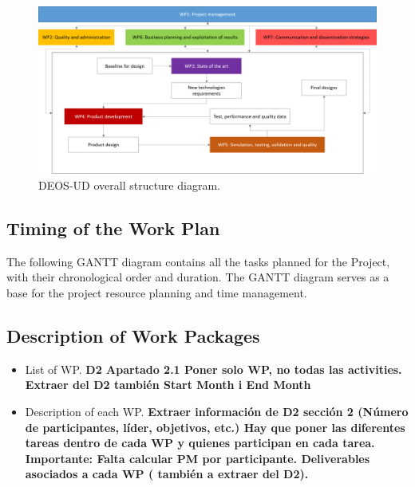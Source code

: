 \begin{figure}[H]
\centering
\includegraphics[width=\textwidth]{images/overallstructure.png}
\caption{DEOS-UD overall structure diagram.} 
\label{overallstructure}
\end{figure}

\subsection{Timing of the Work Plan}

The following GANTT diagram contains all the tasks planned for the Project, with their chronological order and duration. The GANTT diagram serves as a base for the project resource planning and time management.

\subsection{Description of Work Packages}

\begin{itemize}

\item List of WP. \textbf{D2 Apartado 2.1 Poner solo WP, no todas las activities. Extraer del D2 también Start Month i End Month}

\item Description of each WP. \textbf{Extraer información de D2 sección 2 (Número de participantes, líder, objetivos, etc.) Hay que poner las diferentes tareas dentro de cada WP y quienes participan en cada tarea. Importante: Falta calcular PM por participante. Deliverables asociados a cada WP ( también a extraer del D2).}

\end{itemize}

